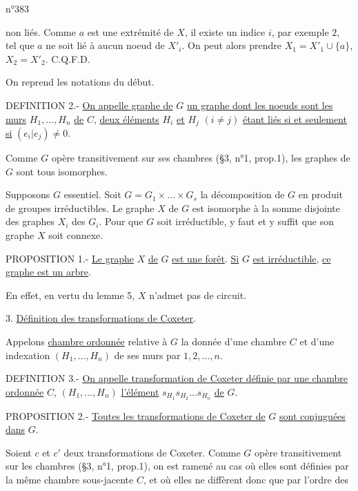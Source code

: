 \hfill n°383

non liés. Comme $a$ est une extrémité de $X$, il existe un indice $i$, par exemple $2$, tel que $a$ ne soit lié à aucun noeud de $X'_i$. On peut alors prendre $X_1=X'_1\cup\{a\}$, $X_2=X'_2$. C.Q.F.D.

On reprend les notations du début.

DEFINITION 2.- \uline{On appelle graphe de} $G$ \uline{un graphe dont les noeuds sont les murs} $H_1,\ldots,H_n$ \uline{de} $C$, \uline{deux éléments} $H_i$ \uline{et} $H_j$ $(i\ne j)$ \uline{étant liés si et seulement si} $(e_i|e_j)\ne0$.

Comme $G$ opère transitivement sur ses chambres (§3, n°1, prop.1), les graphes de $G$ sont tous isomorphes.

Supposons $G$ essentiel. Soit $G=G_1\times\ldots\times G_s$ la décomposition de $G$ en produit de groupes irréductibles. Le graphe $X$ de $G$ est isomorphe à la somme disjointe des graphes $X_i$ des $G_i$. Pour que $G$ soit irréductible, y faut et y suffit que son graphe $X$ soit connexe.

PROPOSITION 1.- \uline{Le graphe} $X$ \uline{de} $G$ \uline{est une forêt}. \uline{Si} $G$ \uline{est irréductible}, \uline{ce graphe est un arbre}.

En effet, en vertu du lemme 5, $X$ n'admet pas de circuit.

3. \uline{Définition des transformations de Coxeter}.

Appelons \uline{chambre ordonnée} relative à $G$ la donnée d'une chambre $C$ et d'une indexation $(H_1,\ldots,H_n)$ de ses murs par $1,2,\ldots,n$.

DEFINITION 3.- \uline{On appelle transformation de Coxeter définie par une chambre ordonnée} $C$, $(H_1,\ldots,H_n)$ \uline{l'élément} $s_{H_1}s_{H_2}\ldots s_{H_n}$ \uline{de} $G$.

PROPOSITION 2.- \uline{Toutes les transformations de Coxeter de} $G$ \uline{sont conjuguées dans} $G$.

Soient $c$ et $c'$ deux transformations de Coxeter. Comme $G$ opère transitivement sur les chambres (§3, n°1, prop.1), on est ramené au cas où elles sont définies par la même chambre sous-jacente $C$, et où elles ne diffèrent donc que par l'ordre des
